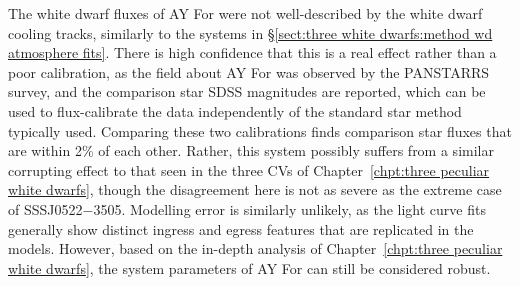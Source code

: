The white dwarf fluxes of AY For were not well-described by the white dwarf cooling tracks, similarly to the systems in \S\ref{sect:three white dwarfs:method wd atmosphere fits}. There is high confidence that this is a real effect rather than a poor calibration, as the field about AY For was observed by the PANSTARRS survey, and the comparison star SDSS magnitudes are reported, which can be used to flux-calibrate the data independently of the standard star method typically used. Comparing these two calibrations finds comparison star fluxes that are within 2\% of each other. Rather, this system possibly suffers from a similar corrupting effect to that seen in the three CVs of Chapter~\ref{chpt:three peculiar white dwarfs}, though the disagreement here is not as severe as the extreme case of SSSJ0522$-$3505. Modelling error is similarly unlikely, as the light curve fits generally show distinct ingress and egress features that are replicated in the models. However, based on the in-depth analysis of Chapter~\ref{chpt:three peculiar white dwarfs}, the system parameters of AY For can still be considered robust.


%     

